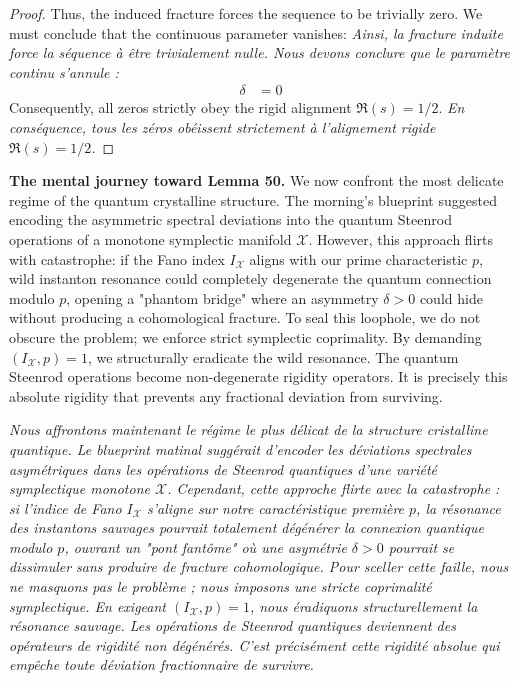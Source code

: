 \documentclass[11pt,a4paper]{article}
\theoremstyle{definition}
\begin{document}
\begin{proof}
Thus, the induced fracture forces the sequence to be trivially zero. We must conclude that the continuous parameter vanishes:
\textit{Ainsi, la fracture induite force la séquence à être trivialement nulle. Nous devons conclure que le paramètre continu s'annule :}
\begin{align*}
\delta &= 0
\end{align*}
Consequently, all zeros strictly obey the rigid alignment $\Re(s) = 1/2$.
\textit{En conséquence, tous les zéros obéissent strictement à l'alignement rigide $\Re(s) = 1/2$.}
\end{proof}

\vspace{1em}
\noindent
\textbf{The mental journey toward Lemma 50.}
We now confront the most delicate regime of the quantum crystalline structure. The morning's blueprint suggested encoding the asymmetric spectral deviations into the quantum Steenrod operations of a monotone symplectic manifold $\mathcal{X}$. However, this approach flirts with catastrophe: if the Fano index $I_{\mathcal{X}}$ aligns with our prime characteristic $p$, wild instanton resonance could completely degenerate the quantum connection modulo $p$, opening a "phantom bridge" where an asymmetry $\delta > 0$ could hide without producing a cohomological fracture. To seal this loophole, we do not obscure the problem; we enforce strict symplectic coprimality. By demanding $(I_{\mathcal{X}}, p) = 1$, we structurally eradicate the wild resonance. The quantum Steenrod operations become non-degenerate rigidity operators. It is precisely this absolute rigidity that prevents any fractional deviation from surviving.

\textit{Nous affrontons maintenant le régime le plus délicat de la structure cristalline quantique. Le blueprint matinal suggérait d'encoder les déviations spectrales asymétriques dans les opérations de Steenrod quantiques d'une variété symplectique monotone $\mathcal{X}$. Cependant, cette approche flirte avec la catastrophe : si l'indice de Fano $I_{\mathcal{X}}$ s'aligne sur notre caractéristique première $p$, la résonance des instantons sauvages pourrait totalement dégénérer la connexion quantique modulo $p$, ouvrant un "pont fantôme" où une asymétrie $\delta > 0$ pourrait se dissimuler sans produire de fracture cohomologique. Pour sceller cette faille, nous ne masquons pas le problème ; nous imposons une stricte coprimalité symplectique. En exigeant $(I_{\mathcal{X}}, p) = 1$, nous éradiquons structurellement la résonance sauvage. Les opérations de Steenrod quantiques deviennent des opérateurs de rigidité non dégénérés. C'est précisément cette rigidité absolue qui empêche toute déviation fractionnaire de survivre.}
\end{document}
